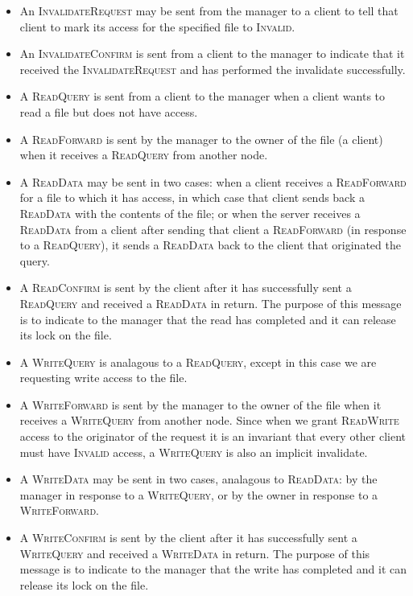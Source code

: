 \documentclass[12pt]{article}	%
\begin{document}
\begin{itemize}
\item An \textsc{InvalidateRequest} may be sent from the manager to a client to tell that client to mark its access for the specified file to \textsc{Invalid}.
\item An \textsc{InvalidateConfirm} is sent from a client to the manager to indicate that it received the \textsc{InvalidateRequest} and has performed the invalidate successfully.

\item A \textsc{ReadQuery} is sent from a client to the manager when a client wants to read a file but does not have access.
\item A \textsc{ReadForward} is sent by the manager to the owner of the file (a client) when it receives a \textsc{ReadQuery} from another node.
\item A \textsc{ReadData} may be sent in two cases: when a client receives a \textsc{ReadForward} for a file to which it has access, in which case that client sends back a \textsc{ReadData} with the contents of the file; or when the server receives a \textsc{ReadData} from a client after sending that client a \textsc{ReadForward} (in response to a \textsc{ReadQuery}), it sends a \textsc{ReadData} back to the client that originated the query.
\item A \textsc{ReadConfirm} is sent by the client after it has successfully sent a \textsc{ReadQuery} and received a \textsc{ReadData} in return. The purpose of this message is to indicate to the manager that the read has completed and it can release its lock on the file.

\item A \textsc{WriteQuery} is analagous to a \textsc{ReadQuery}, except in this case we are requesting write access to the file.
\item A \textsc{WriteForward} is sent by the manager to the owner of the file when it receives a \textsc{WriteQuery} from another node. Since when we grant \textsc{ReadWrite} access to the originator of the request it is an invariant that every other client must have \textsc{Invalid} access, a \textsc{WriteQuery} is also an implicit invalidate.
\item A \textsc{WriteData} may be sent in two cases, analagous to \textsc{ReadData}: by the manager in response to a \textsc{WriteQuery}, or by the owner in response to a \textsc{WriteForward}.
\item A \textsc{WriteConfirm} is sent by the client after it has successfully sent a \textsc{WriteQuery} and received a \textsc{WriteData} in return. The purpose of this message is to indicate to the manager that the write has completed and it can release its lock on the file.
\end{itemize}
\end{document}

